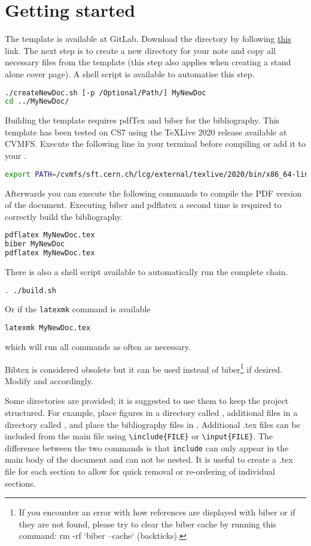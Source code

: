 \section{Getting started}
\label{sec:basics}
The \latex template is available at GitLab. Download the directory by following \href{https://gitlab.cern.ch/aidainnova/templates/document.git}{this} link. The next step is to create a new directory for your note and copy all necessary files from the template (this step also applies when creating a stand alone cover page). A shell script is available to automatise this step.
\begin{lstlisting}[language=bash]
./createNewDoc.sh [-p /Optional/Path/] MyNewDoc
cd ../MyNewDoc/
\end{lstlisting}
Building the template requires pdfTex and biber for the bibliography. This template has been tested on CS7 using the TeXLive 2020 release available at CVMFS. Execute the following line in your terminal before compiling or add it to your .
\begin{lstlisting}[language=bash]
export PATH=/cvmfs/sft.cern.ch/lcg/external/texlive/2020/bin/x86_64-linux:$PATH
\end{lstlisting}
Afterwards you can execute the following commands to compile the PDF version of the document. Executing biber and pdflatex a second time is required to correctly build the bibliography.
\begin{lstlisting}[language=bash]
pdflatex MyNewDoc.tex
biber MyNewDoc
pdflatex MyNewDoc.tex
\end{lstlisting}
There is also a shell script available to automatically run the complete chain.
\begin{lstlisting}[language=bash]
. ./build.sh
\end{lstlisting}
Or if the \texttt{latexmk} command is available
\begin{lstlisting}[language=bash]
latexmk MyNewDoc.tex
\end{lstlisting}
which will run all commands as often as necessary.

Bibtex is considered obsolete but it can be used instead of biber\footnote{If you encounter an error with how references are displayed with biber or if they are not found, please try to clear the biber cache by running this command: rm -rf `biber --cache` (backticks).} if desired. Modify  and  accordingly.

Some directories are provided; it is suggested to use them to keep the project structured. For example, place figures in a directory called , additional \latex files in a directory called , and place the bibliography files in . Additional .tex files can be included from the main \latex file using \texttt{\textbackslash include\{FILE\}} or \texttt{\textbackslash input\{FILE\}}. The difference between the two commands is that \texttt{include} can only appear in the main body of the document and can not be nested. It is useful to create a .tex file for each section to allow for quick removal or re-ordering of individual sections. 

